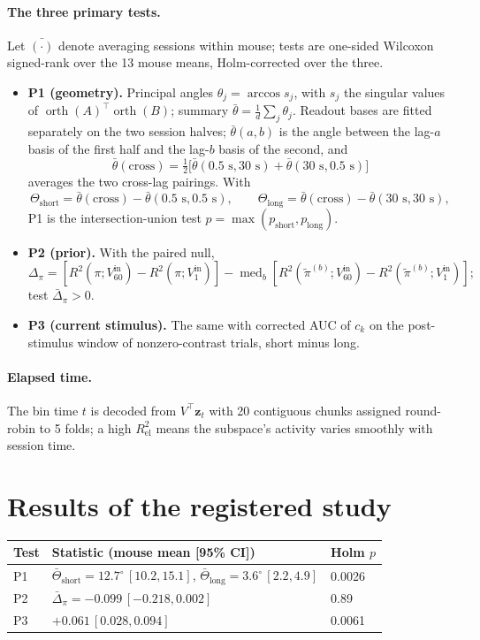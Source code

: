 \documentclass[11pt]{article}
\newcommand{\orth}{\operatorname{orth}}
\newcommand{\med}{\operatorname{med}}
\begin{document}
\paragraph{The three primary tests.} Let $\bar{(\cdot)}$ denote averaging sessions within mouse; tests are one-sided
Wilcoxon signed-rank over the 13 mouse means, Holm-corrected over the three.
\begin{itemize}
\item \textbf{P1 (geometry).} Principal angles $\theta_j = \arccos s_j$, with $s_j$ the singular values of
  $\orth(A)^\top \orth(B)$; summary $\bar\theta = \frac1d \sum_j \theta_j$. Readout bases are fitted separately on the
  two session halves; $\bar\theta(a, b)$ is the angle between the lag-$a$ basis of the first half and the lag-$b$ basis
  of the second, and
  \[
  \bar\theta(\text{cross}) = \tfrac12\big[\bar\theta(0.5\text{ s}, 30\text{ s}) + \bar\theta(30\text{ s}, 0.5\text{ s})\big]
  \]
  averages the two cross-lag pairings. With
  \[
  \Theta_{\mathrm{short}} = \bar\theta(\text{cross}) - \bar\theta(0.5\text{ s}, 0.5\text{ s}), \qquad
  \Theta_{\mathrm{long}} = \bar\theta(\text{cross}) - \bar\theta(30\text{ s}, 30\text{ s}),
  \]
  P1 is the intersection-union test $p = \max(p_{\mathrm{short}}, p_{\mathrm{long}})$.
\item \textbf{P2 (prior).} With the paired null,
  \[
  \Delta_\pi = [R^2(\pi; V^{\mathrm{in}}_{60}) - R^2(\pi; V^{\mathrm{in}}_{1})] -
  \med_b[R^2(\tilde\pi^{(b)}; V^{\mathrm{in}}_{60}) - R^2(\tilde\pi^{(b)}; V^{\mathrm{in}}_{1})];
  \]
  test $\bar\Delta_\pi > 0$.
\item \textbf{P3 (current stimulus).} The same with corrected AUC of $c_k$ on the post-stimulus window of
  nonzero-contrast trials, short minus long.
\end{itemize}

\paragraph{Elapsed time.} The bin time $t$ is decoded from $V^\top \bm z_t$ with 20 contiguous chunks assigned
round-robin to 5 folds; a high $R^2_{\mathrm{el}}$ means the subspace's activity varies smoothly with session time.

\section{Results of the registered study}
\label{sec:regres}

\begin{center}
\begin{tabular}{lll}
\toprule
Test & Statistic (mouse mean [95\% CI]) & Holm $p$ \\
\midrule
P1 & $\bar\Theta_{\mathrm{short}} = 12.7^\circ\,[10.2, 15.1]$, $\bar\Theta_{\mathrm{long}} = 3.6^\circ\,[2.2, 4.9]$ & 0.0026 \\
P2 & $\bar\Delta_\pi = -0.099\,[-0.218, 0.002]$ & 0.89 \\
P3 & $+0.061\,[0.028, 0.094]$ & 0.0061 \\
\bottomrule
\end{tabular}
\end{center}
\end{document}
